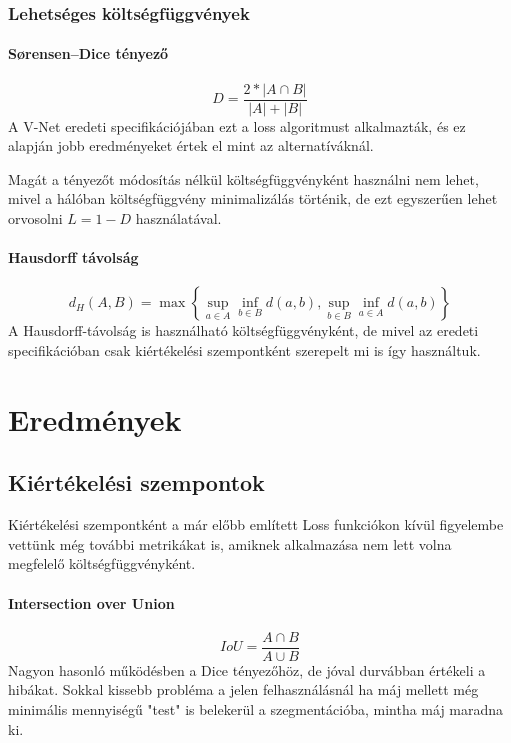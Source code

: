 \documentclass[a4paper]{article}
\begin{document}
	\subsubsection*{Lehetséges költségfüggvények}
	\paragraph{Sørensen–Dice tényező}
	\begin{equation}
	D = \frac {2*|{A \cap B}|}{|A|+|B|}
	\end{equation}
	A V-Net eredeti specifikációjában\cite{2016arXiv160604797M} ezt a loss algoritmust alkalmazták, és ez alapján jobb eredményeket értek el mint az alternatíváknál.

	Magát a tényezőt módosítás nélkül költségfüggvényként használni nem lehet, mivel a hálóban költségfüggvény minimalizálás történik, de ezt egyszerűen lehet orvosolni \(L = 1-D\) használatával.
	\paragraph{Hausdorff távolság}
	\begin{equation}
	{d}_{H}(A,B)  = \max\left\{ \sup_{a\in A} \inf_{b\in B} {d}(a,b),\sup_{b\in B} \inf_{a\in A}{d}(a,b)\right\}
	\end{equation}
	A Hausdorff-távolság is használható költségfüggvényként, de mivel az eredeti specifikációban\cite{2016arXiv160604797M} csak kiértékelési szempontként szerepelt mi is így használtuk.
	\section*{Eredmények}
	\subsection*{Kiértékelési szempontok}
	Kiértékelési szempontként a már előbb említett Loss funkciókon kívül figyelembe vettünk még további metrikákat is, amiknek alkalmazása nem lett volna megfelelő költségfüggvényként.
	\paragraph{Intersection over Union}
	\begin{equation}
	IoU = \frac{A\cap B} {A \cup B}
	\end{equation}
	Nagyon hasonló működésben a Dice tényezőhöz, de jóval durvábban értékeli a hibákat. Sokkal kissebb probléma a jelen felhasználásnál ha máj mellett még minimális mennyiségű "test" is belekerül a szegmentációba, mintha máj maradna ki.
\end{document}
